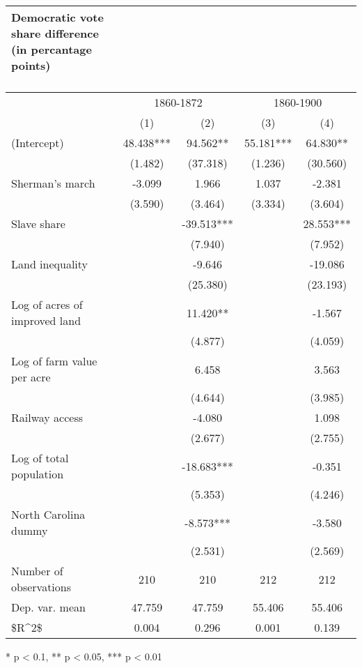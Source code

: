 \captionsetup[table]{labelformat=empty,skip=1pt}
\begin{longtable}{lcccc}
\caption*{
\large Democratic vote share difference (in percantage points)\\ 
\small \\ 
} \\ 
\toprule
& \multicolumn{2}{c}{1860-1872} & \multicolumn{2}{c}{1860-1900} \\ 
 \cmidrule(lr){2-3}\cmidrule(lr){4-5}
  & (1) & (2) & (3) & (4) \\ 
\midrule
(Intercept) & 48.438*** & 94.562** & 55.181*** & 64.830** \\ 
 & (1.482) & (37.318) & (1.236) & (30.560) \\ 
Sherman's march & -3.099 & 1.966 & 1.037 & -2.381 \\ 
 & (3.590) & (3.464) & (3.334) & (3.604) \\ 
Slave share &  & -39.513*** &  & 28.553*** \\ 
 &  & (7.940) &  & (7.952) \\ 
Land inequality &  & -9.646 &  & -19.086 \\ 
 &  & (25.380) &  & (23.193) \\ 
Log of acres of improved land &  & 11.420** &  & -1.567 \\ 
 &  & (4.877) &  & (4.059) \\ 
Log of farm value per acre &  & 6.458 &  & 3.563 \\ 
 &  & (4.644) &  & (3.985) \\ 
Railway access &  & -4.080 &  & 1.098 \\ 
 &  & (2.677) &  & (2.755) \\ 
Log of total population &  & -18.683*** &  & -0.351 \\ 
 &  & (5.353) &  & (4.246) \\ 
North Carolina dummy &  & -8.573*** &  & -3.580 \\ 
 &  & (2.531) &  & (2.569) \\ 
Number of observations & 210 & 210 & 212 & 212 \\ 
Dep. var. mean & 47.759 & 47.759 & 55.406 & 55.406 \\ 
\$R\textasciicircum 2\$ & 0.004 & 0.296 & 0.001 & 0.139 \\ 
\bottomrule
\end{longtable}
\begin{minipage}{\linewidth}
* p < 0.1, ** p < 0.05, *** p < 0.01\\ 
\end{minipage}

